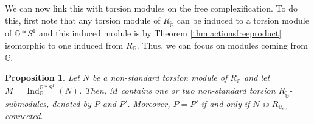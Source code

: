 \documentclass[a4paper, 11pt]{amsart}
\theoremstyle{plain}
\newtheorem{prop}[thm]{Proposition}
\theoremstyle{definition}
\theoremstyle{remark}
\DeclareMathOperator{\Ind}{Ind}
\newcommand{\G}{\mathbb{G}}
\newcommand{\Z}{\mathbb{Z}}
\begin{document}
\begin{comment}
The previous proposition is therefore not sufficient to describe the link between torsion actions of $\G$ and $\G_{ev}$. The best that we are able to say is that if the only non-standard $R_{\G_{ev}}$-module is $R_{odd}$, then torsion modules of $R_{\G}$ are in one-to-one correspondence with torsion modules on $R_{\G_{ev}}$ different from $R_{odd}$. This is at least enough to treat the case which is interesting from the point of view of free quantum groups : $H_{N}^{+}$. Note that it has a natural fundamental representation $u = u^{1}su^{1}$, where $s$ is the generator of $\Z_{2}$ seen as an irreducible representation.

\begin{prop}
Let $\G = H_{N}^{+}$. Then, $R_{odd}$ is the only non-standard $R_{\G_{ev}}$-module without odd stabilizers.
\end{prop}

\begin{proof}
First recall that the only non-standard torsion module on $R_{\Z_{2}}$ is $\Z.j_{0}$ with the trivial action. Thus, the only module that we have to consider is the one generated by $u^{1}a$ in $\Ind_{\Z_{2}}^{\Z_{2}\ast SU_{q}(2)}(\Z.j_{0})$. From the explicit description of the embedding $\Lambda$, $u^{1}su^{1}$ is an odd stabilizer of $u^{1}j_{0}$ and we conclude by Proposition \ref{prop:torsionevenpart}.
\end{proof}
\end{comment}

We can now link this with torsion modules on the free complexification. To do this, first note that any torsion module of $R_{\widetilde{\G}}$ can be induced to a torsion module of $\G\ast S^{1}$ and this induced module is by Theorem \ref{thm:actionsfreeproduct} isomorphic to one induced from $R_{\G}$. Thus, we can focus on modules coming from $\G$.

\begin{prop}\label{prop:torsionfreecomplexification}
Let $N$ be a non-standard torsion module of $R_{\G}$ and let $M = \Ind_{\G}^{\G\ast S^{1}}(N)$. Then, $M$ contains one or two non-standard torsion $R_{\widetilde{\G}}$-submodules, denoted by $P$ and $P'$. Moreover, $P = P'$ if and only if $N$ is $R_{\G_{ev}}$-connected.
\end{prop}
\end{document}
